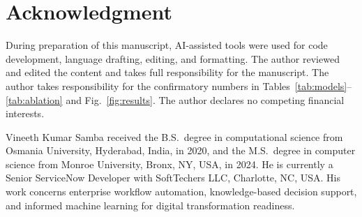 \documentclass[10pt,journal,compsoc]{IEEEtran}
\begin{document}
\section*{Acknowledgment}

During preparation of this manuscript, AI-assisted tools were used for code development, language drafting, editing, and formatting. The author reviewed and edited the content and takes full responsibility for the manuscript. The author takes responsibility for the confirmatory numbers in Tables~\ref{tab:models}--\ref{tab:ablation} and Fig.~\ref{fig:results}. The author declares no competing financial interests.




\begin{IEEEbiographynophoto}{Vineeth Kumar Samba}
received the B.S.\ degree in computational science from Osmania University, Hyderabad, India, in 2020, and the M.S.\ degree in computer science from Monroe University, Bronx, NY, USA, in 2024. He is currently a Senior ServiceNow Developer with SoftTechers LLC, Charlotte, NC, USA. His work concerns enterprise workflow automation, knowledge-based decision support, and informed machine learning for digital transformation readiness.
\end{IEEEbiographynophoto}
\end{document}
